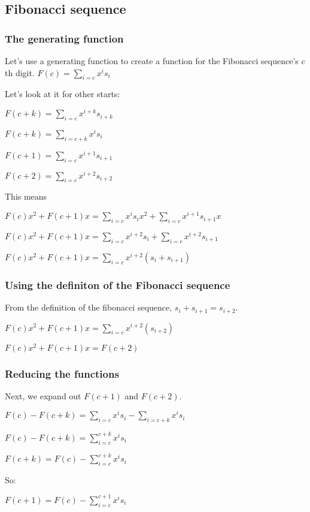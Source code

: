 \subsection{Fibonacci sequence}

\subsubsection{The generating function}

Let's use a generating function to create a function for the Fibonacci sequence's \(c\)th digit.
\(F(c)=\sum_{i=c} x^is_i\)

Let's look at it for other starts:

\(F(c+k)=\sum_{i=c} x^{i+k}s_{i+k}\)

\(F(c+k)=\sum_{i=c+k} x^is_i\)

\(F(c+1)=\sum_{i=c} x^{i+1}s_{i+1}\)

\(F(c+2)=\sum_{i=c} x^{i+2}s_{i+2}\)

This means

\(F(c)x^2+F(c+1)x=\sum_{i=c} x^i s_i x^2 +\sum_{i=c} x^{i+1} s_{i+1} x\)

\(F(c)x^2+F(c+1)x=\sum_{i=c} x^{i+2}s_i+\sum_{i=c} x^{i+2}s_{i+1}\)

\(F(c)x^2+F(c+1)x=\sum_{i=c} x^{i+2}(s_i+s_{i+1})\)
\subsubsection{Using the definiton of the Fibonacci sequence}

From the definition of the fibonacci sequence, \(s_{i}+s_{i+1}=s_{i+2}\).

\(F(c)x^2+F(c+1)x=\sum_{i=c} x^{i+2}(s_{i+2})\)

\(F(c)x^2+F(c+1)x=F(c+2)\)

\subsubsection{Reducing the functions}

Next, we expand out \(F(c+1)\) and \(F(c+2)\).

\(F(c)-F(c+k)=\sum_{i=c} x^i s_i -\sum_{i=c+k} x^i s_i\)

\(F(c)-F(c+k)=\sum^{c+k}_{i=c} x^i s_i\)

\(F(c+k)=F(c)-\sum^{c+k}_{i=c} x^i s_i\)

So:

\(F(c+1)=F(c)-\sum^{c+1}_{i=c} x^i s_i\)


